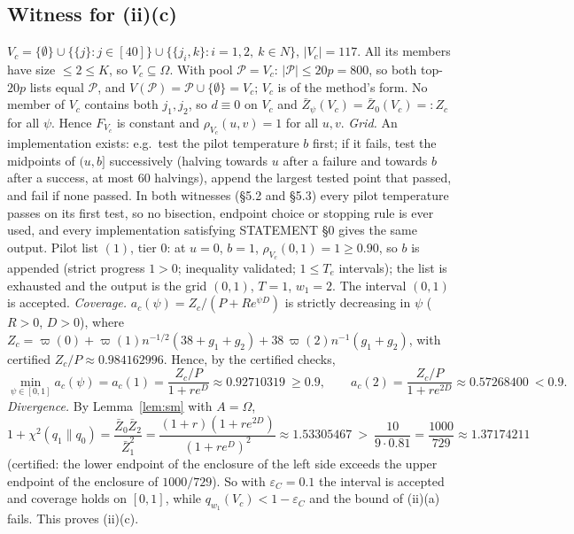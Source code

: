 \documentclass[11pt]{article}
\theoremstyle{remark}
\newcommand{\Zb}{\bar Z}
\newcommand{\Pool}{\mathcal{P}}
\newcommand{\chisq}{\chi^2}
\begin{document}
\subsection{Witness for (ii)(c)}
$V_c=\{\emptyset\}\cup\{\{j\}:j\in[40]\}\cup\{\{j_i,k\}:i=1,2,\ k\in N\}$, $|V_c|=117$. All its members have size $\le2\le K$, so $V_c\subseteq\Omega$. With pool $\Pool=V_c$: $|\Pool|\le 20p=800$, so both top-$20p$ lists equal $\Pool$, and $V(\Pool)=\Pool\cup\{\emptyset\}=V_c$; $V_c$ is of the method's form.
No member of $V_c$ contains both $j_1,j_2$, so $d\equiv0$ on $V_c$ and $\Zb_\psi(V_c)=\Zb_0(V_c)=:Z_c$ for all $\psi$. Hence $F_{V_c}$ is constant and $\rho_{V_c}(u,v)=1$ for all $u,v$.
\emph{Grid.} An implementation exists: e.g.\ test the pilot temperature $b$ first; if it fails, test the midpoints of $(u,b]$ successively (halving towards $u$ after a failure and towards $b$ after a success, at most 60 halvings), append the largest tested point that passed, and fail if none passed. In both witnesses (\S5.2 and \S5.3) every pilot temperature passes on its first test, so no bisection, endpoint choice or stopping rule is ever used, and every implementation satisfying STATEMENT \S0 gives the same output. Pilot list $(1)$, tier $0$: at $u=0$, $b=1$, $\rho_{V_c}(0,1)=1\ge0.90$, so $b$ is appended (strict progress $1>0$; inequality validated; $1\le T_e$ intervals); the list is exhausted and the output is the grid $(0,1)$, $T=1$, $w_1=2$. The interval $(0,1)$ is accepted.
\emph{Coverage.} $a_c(\psi)=Z_c/(P+Re^{\psi D})$ is strictly decreasing in $\psi$ ($R>0$, $D>0$), where
$Z_c=\varpi(0)+\varpi(1)n^{-1/2}(38+g_1+g_2)+38\,\varpi(2)n^{-1}(g_1+g_2)$, with certified $Z_c/P\approx0.984162996$. Hence, by the certified checks,
\[
\min_{\psi\in[0,1]}a_c(\psi)=a_c(1)=\frac{Z_c/P}{1+re^{D}}\approx0.92710319\ \ge0.9,\qquad
a_c(2)=\frac{Z_c/P}{1+re^{2D}}\approx0.57268400\ <0.9 .
\]
\emph{Divergence.} By Lemma~\ref{lem:sm} with $A=\Omega$,
\[
1+\chisq(q_1\|q_0)=\frac{\Zb_0\Zb_2}{\Zb_1^2}=\frac{(1+r)(1+re^{2D})}{(1+re^D)^2}\approx1.53305467\ >\ \frac{10}{9\cdot0.81}=\frac{1000}{729}\approx1.37174211
\]
(certified: the lower endpoint of the enclosure of the left side exceeds the upper endpoint of the enclosure of $1000/729$).
So with $\varepsilon_C=0.1$ the interval is accepted and coverage holds on $[0,1]$, while $q_{w_1}(V_c)<1-\varepsilon_C$ and the bound of (ii)(a) fails. This proves (ii)(c).
\end{document}
